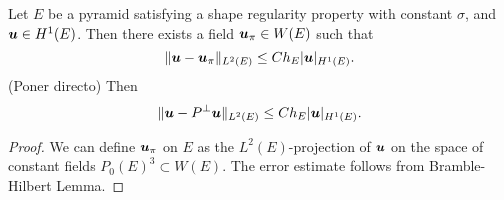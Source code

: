 \begin{proposition}\label{propupi}
Let $E$ be a pyramid satisfying a shape regularity property with constant $\sigma$, and $\boldsymbol{u}\in H^1(E)$. 
Then there exists a field $\boldsymbol{u}_\pi\in W(E)$ such that
\[
\|\boldsymbol{u}-\boldsymbol{u}_\pi\|_{L^2(E)}\le C h_E|\boldsymbol{u}|_{H^1(E)}.
\]
(Poner directo) Then
\[
\|\boldsymbol{u}-P^{\perp}\boldsymbol{u}\|_{L^2(E)}\le C h_E|\boldsymbol{u}|_{H^1(E)}.
\]
\end{proposition}
\begin{proof}
We can define $\boldsymbol{u}_\pi$ on $E$ as the $L^2(E)$-projection of $\boldsymbol{u}$ on the space of constant fields $P_0(E)^3\subset W(E)$. The error estimate follows from Bramble-Hilbert Lemma.  
\end{proof}
